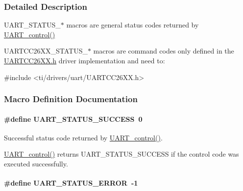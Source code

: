 \subsubsection{Detailed Description}
U\+A\+R\+T\+\_\+\+S\+T\+A\+T\+U\+S\+\_\+$\ast$ macros are general status codes returned by \hyperlink{_u_a_r_t_8h_a9de3c26cfe4ce6b7f350a6ea6e16801d}{U\+A\+R\+T\+\_\+control()}

U\+A\+R\+T\+C\+C26\+X\+X\+\_\+\+S\+T\+A\+T\+U\+S\+\_\+$\ast$ macros are command codes only defined in the \hyperlink{_u_a_r_t_c_c26_x_x_8h}{U\+A\+R\+T\+C\+C26\+X\+X.\+h} driver implementation and need to\+: 
\begin{DoxyCode}
\textcolor{preprocessor}{#include <ti/drivers/uart/UARTCC26XX.h>}
\end{DoxyCode}
 

\subsubsection{Macro Definition Documentation}
\paragraph[{U\+A\+R\+T\+\_\+\+S\+T\+A\+T\+U\+S\+\_\+\+S\+U\+C\+C\+E\+S\+S}]{\setlength{\rightskip}{0pt plus 5cm}\#define U\+A\+R\+T\+\_\+\+S\+T\+A\+T\+U\+S\+\_\+\+S\+U\+C\+C\+E\+S\+S~0}\label{group___u_a_r_t___s_t_a_t_u_s_ga101b7761f89b3ec49f0c6726669acfed}


Successful status code returned by \hyperlink{_u_a_r_t_8h_a9de3c26cfe4ce6b7f350a6ea6e16801d}{U\+A\+R\+T\+\_\+control()}. 

\hyperlink{_u_a_r_t_8h_a9de3c26cfe4ce6b7f350a6ea6e16801d}{U\+A\+R\+T\+\_\+control()} returns U\+A\+R\+T\+\_\+\+S\+T\+A\+T\+U\+S\+\_\+\+S\+U\+C\+C\+E\+S\+S if the control code was executed successfully. 
\paragraph[{U\+A\+R\+T\+\_\+\+S\+T\+A\+T\+U\+S\+\_\+\+E\+R\+R\+O\+R}]{\setlength{\rightskip}{0pt plus 5cm}\#define U\+A\+R\+T\+\_\+\+S\+T\+A\+T\+U\+S\+\_\+\+E\+R\+R\+O\+R~-\/1}\label{group___u_a_r_t___s_t_a_t_u_s_ga2ae076f4aae13ca8e2aea674207df0ad}


